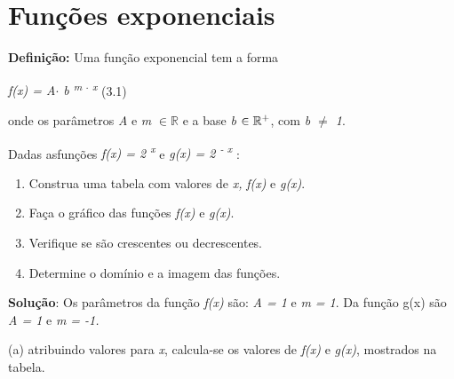 \section{Funções exponenciais}

\begin{caixa}
\textbf{Definição:} Uma função exponencial tem a forma

  \textit{f(x) = A$ \cdot $  b \textsuperscript{m $ \cdot $  x      }} (3.1)

onde os parâmetros  \textit{A }e \textit{m} $\in \mathbb{R}$  e a base \textit{b} $ \in \mathbb{R} \textsuperscript{+}$, com \textit{b $ \neq $  1}.
\end{caixa}

\begin{texemplo}
Dadas asfunções   \textit{f(x) =  2\textsuperscript{ x}} e \textit{g(x) =  2\textsuperscript{ - x}} :

\begin{enumerate}
	\item Construa uma tabela com valores de \textit{x, } \textit{f(x)} e \textit{g(x)}.

	\item Faça o gráfico das funções  \textit{f(x)} e \textit{g(x)}.

	\item Verifique se são crescentes ou decrescentes.

	\item Determine o domínio e a imagem das funções.
\end{enumerate}

\textbf{Solução}: Os parâmetros da função \textit{f(x)} são: \textit{A = 1} e \textit{m = 1}. Da função g(x) são \textit{A = 1} e \textit{m = -1.}

(a) atribuindo valores para \textit{x}, calcula-se os valores de \textit{f(x)} e \textit{g(x)}, mostrados na tabela. 


\end{texemplo}
